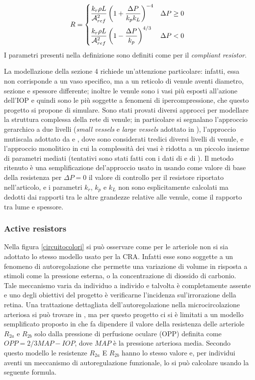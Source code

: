 \documentclass{article}
\begin{document}
\begin{equation}
R = \begin{dcases}
\frac{k_r \rho L}{\mathcal{A}_{ref}^2}\left( 1 + \frac{\Delta P}{k_p k_L}\right)^{-4} & \Delta P \ge 0\\
\frac{k_r \rho L}{\mathcal{A}_{ref}^2}\left( 1- \frac{\Delta P}{k_p}\right)^{4/3} & \Delta P < 0\\
\end{dcases}
\label{starlingR}
\end{equation}
I parametri presenti nella definizione sono definiti come per il \textit{compliant resistor}.

La modellazione della sezione 4 richiede un'attenzione particolare: infatti, essa non corrisponde a un vaso specifico, ma a un reticolo di venule aventi diametro, sezione e spessore differente; inoltre le venule sono i vasi più esposti all'azione dell'IOP e quindi sono le più soggette a fenomeni di ipercompressione, che questo progetto si propone di simulare.
Sono stati provati diversi approcci per modellare la struttura complessa della rete di venule; in particolare si segnalano l'approccio gerarchico a due livelli (\textit{small vessels} e \textit{large vessels} adottato in \cite{Libro}), l'approccio mutiscala adottato da \cite{art1} e \cite{Tesi}, dove sono considerati tredici diversi livelli di venule, e l'approccio monolitico in cui la complessità dei vasi è ridotta a un piccolo insieme di parametri mediati (tentativi sono stati fatti con i dati di \cite{art2} e di \cite{Duker}).
Il metodo ritenuto è una semplificazione del'approccio usato in \cite{art1} usando come valore di base della resistenza per $\Delta P = 0$ il valore di controllo per il resistore riportato nell'articolo, e i parametri $k_r$, $k_p$ e $k_L$ non sono esplicitamente calcolati ma dedotti dai rapporti tra le altre grandezze relative alle venule, come il rapporto tra lume e spessore.

\subsubsection*{Active resistors}
Nella figura \ref{circuitocolori} si può osservare come per le arteriole non si sia adottato lo stesso modello usato per la CRA.
Infatti esse sono soggette a un fenomeno di autoregolazione che permette una variazione di volume in risposta a stimoli come la pressione esterna, o la concentrazione di diossido di carbonio.
Tale meccanismo varia da individuo a individo e talvolta è completamente assente e uno degli obiettivi del progetto è verificarne l'incidenza sul'irrorazione della retina.
Una trattazione dettagliata dell'autoregolazione nella microcircolazione arteriosa si può trovare in \cite{Tesi}, ma per questo progetto ci si è limitati a un modello semplificato proposto in \cite{art1} che fa dipendere il valore della resistenza delle arteriole $R_{2a}$ e $R_{2b}$ solo dalla pressione di perfusione oculare (OPP) definita come $OPP = 2/3 MAP - IOP$, dove $MAP$ è la pressione arteriosa media.
Secondo questo modello le resistenze $R_{2a}$ E $R_{2b}$ hanno lo stesso valore e, per individui aventi un meccanismo di autoregulazione funzionale, lo si può calcolare usando la seguente formula.
\end{document}
